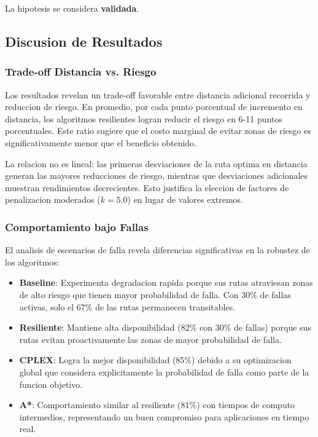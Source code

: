 \documentclass[conference]{IEEEtran}
\begin{document}
La hipotesis se considera \textbf{validada}.

\subsection{Discusion de Resultados}

\subsubsection{Trade-off Distancia vs. Riesgo}

Los resultados revelan un trade-off favorable entre distancia adicional recorrida y reduccion de riesgo. En promedio, por cada punto porcentual de incremento en distancia, los algoritmos resilientes logran reducir el riesgo en 6-11 puntos porcentuales. Este ratio sugiere que el costo marginal de evitar zonas de riesgo es significativamente menor que el beneficio obtenido.

La relacion no es lineal: las primeras desviaciones de la ruta optima en distancia generan las mayores reducciones de riesgo, mientras que desviaciones adicionales muestran rendimientos decrecientes. Esto justifica la eleccion de factores de penalizacion moderados ($k = 5.0$) en lugar de valores extremos.

\subsubsection{Comportamiento bajo Fallas}

El analisis de escenarios de falla revela diferencias significativas en la robustez de los algoritmos:

\begin{itemize}
    \item \textbf{Baseline}: Experimenta degradacion rapida porque sus rutas atraviesan zonas de alto riesgo que tienen mayor probabilidad de falla. Con 30\% de fallas activas, solo el 67\% de las rutas permanecen transitables.

    \item \textbf{Resiliente}: Mantiene alta disponibilidad (82\% con 30\% de fallas) porque sus rutas evitan proactivamente las zonas de mayor probabilidad de falla.

    \item \textbf{CPLEX}: Logra la mejor disponibilidad (85\%) debido a su optimizacion global que considera explicitamente la probabilidad de falla como parte de la funcion objetivo.

    \item \textbf{A*}: Comportamiento similar al resiliente (81\%) con tiempos de computo intermedios, representando un buen compromiso para aplicaciones en tiempo real.
\end{itemize}
\end{document}
